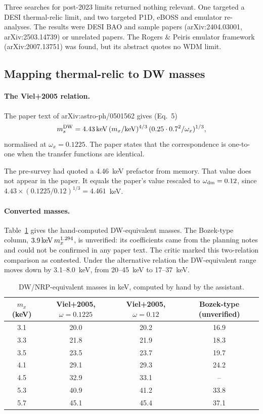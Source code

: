\documentclass[11pt,a4paper]{article}
\begin{document}
Three searches for post-2023 limits returned nothing relevant. One targeted a DESI thermal-relic limit, and two targeted P1D, eBOSS and emulator re-analyses. The results were DESI BAO and sample papers (arXiv:2404.03001, arXiv:2503.14739) or unrelated papers. The Rogers \& Peiris emulator framework (arXiv:2007.13751) was found, but its abstract quotes no WDM limit.

\subsection{Mapping thermal-relic to DW masses}

\paragraph{The Viel+2005 relation.} The paper text of arXiv:astro-ph/0501562 gives (Eq.~5)
\[
m_s^{\rm DW}=4.43\,{\rm keV}\,(m_x/{\rm keV})^{4/3}\,(0.25\cdot0.7^2/\omega_x)^{1/3},
\]
normalised at $\omega_x=0.1225$. The paper states that the correspondence is one-to-one when the transfer functions are identical.

The pre-survey had quoted a 4.46~keV prefactor from memory. That value does not appear in the paper. It equals the paper's value rescaled to $\omega_{\rm dm}=0.12$, since $4.43\times(0.1225/0.12)^{1/3}=4.461$~keV.

\paragraph{Converted masses.} Table~\ref{tab:map} gives the hand-computed DW-equivalent masses. The Bozek-type column, $3.9\,{\rm keV}\,m_x^{1.294}$, is unverified: its coefficients came from the planning notes and could not be confirmed in any paper text. The critic marked this two-relation comparison as contested. Under the alternative relation the DW-equivalent range moves down by 3.1--8.0~keV, from 20--45~keV to 17--37~keV.

\begin{table}
\centering
\begin{tabular}{cccc}
\toprule
$m_x$ (keV) & Viel+2005, $\omega=0.1225$ & Viel+2005, $\omega=0.12$ & Bozek-type (unverified) \\
\midrule
3.1 & 20.0 & 20.2 & 16.9 \\
3.3 & 21.8 & 21.9 & 18.3 \\
3.5 & 23.5 & 23.7 & 19.7 \\
4.1 & 29.1 & 29.3 & 24.2 \\
4.5 & 32.9 & 33.1 & -- \\
5.3 & 40.9 & 41.2 & 33.8 \\
5.7 & 45.1 & 45.4 & 37.1 \\
\bottomrule
\end{tabular}
\caption{DW/NRP-equivalent masses in keV, computed by hand by the assistant.}
\label{tab:map}
\end{table}
\end{document}
